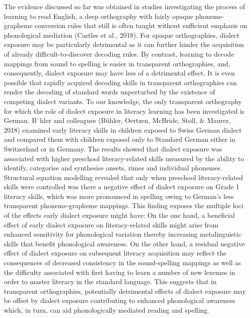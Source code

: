 \documentclass[doc,floatsintext]{apa6}
\begin{document}
The evidence discussed so far was obtained in studies investigating the
process of learning to read English, a deep orthography with fairly
opaque phoneme-grapheme conversion rules that still is often taught
without sufficient emphasis on phonological mediation (Castles et al.,
2018). For opaque orthographies, dialect exposure may be particularly
detrimental as it can further hinder the acquisition of already
difficult-to-discover decoding rules. By contrast, learning to decode
mappings from sound to spelling is easier in transparent orthographies,
and, consequently, dialect exposure may have less of a detrimental
effect. It is even possible that rapidly acquired decoding skills in
transparent orthographies can render the decoding of standard words
unperturbed by the existence of competing dialect variants. To our
knowledge, the only transparent orthography for which the role of
dialect exposure in literacy learning has been investigated is German.
B¨hler and colleagues (Bühler, Oertzen, McBride, Stoll, \& Maurer, 2018)
examined early literacy skills in children exposed to Swiss German
dialect and compared them with children exposed only to Standard German
either in Switzerland or in Germany. The results showed that dialect
exposure was associated with higher preschool literacy-related skills
measured by the ability to identify, categorise and synthesise onsets,
rimes and individual phonemes. Structural equation modelling revealed
that only when preschool literacy-related skills were controlled was
there a negative effect of dialect exposure on Grade 1 literacy skills,
which was more pronounced in spelling owing to German's less transparent
phoneme-grapheme mappings. This finding exposes the multiple loci of the
effects early dialect exposure might have: On the one hand, a beneficial
effect of early dialect exposure on literacy-related skills might arise
from enhanced sensitivity for phonological variation thereby increasing
metalinguistic skills that benefit phonological awareness. On the other
hand, a residual negative effect of dialect exposure on subsequent
literacy acquisition may reflect the consequences of decreased
consistency in the sound-spelling mappings as well as the difficulty
associated with first having to learn a number of new lexemes in order
to master literacy in the standard language. This suggests that in
transparent orthographies, potentially detrimental effects of dialect
exposure may be offset by dialect exposure contributing to enhanced
phonological awareness which, in turn, can aid phonologically mediated
reading and spelling.
\end{document}
